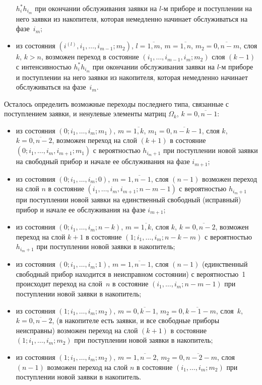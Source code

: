 \begin{multicols}{2}
\begin{itemize}
$h_i^*h_{i_m}$ при окончании обслуживания заявки на $l$-м приборе
и поступлении на него заявки из накопителя, которая немедленно
начинает обслуживаться на фазе~$i_m$;
\item
из состояния $\left(i^{(l)},i_1,\ldots,i_{m-1};m_2\right)$,
$l=\overline{1,m}$, $m=\overline{1,n}$,
$m_2=\overline{0,n-m}$, слоя $k$, $k>n$, возможен переход
в состояние $\left(i_1,\ldots, i_{m-1},i_m;m_2\right)$ слоя $(k-1)$ с
интенсивностью $h_i^*h_{i_m}$ при окончании обслуживания заявки
на $l$-м приборе и поступлении на него заявки из накопителя,
которая немедленно начинает обслуживаться на фазе~$i_m$.
\end{itemize}

Осталось определить возможные переходы последнего типа, связанные
с поступлением заявки, и ненулевые элементы матриц
$\Omega_k$, $k=\overline{0,n-1}$:
\begin{itemize}
\item из состояния $\left(0;i_1,\ldots,i_m;m_1\right)$, $m=\overline{1,k}$,
$m_1=\overline{0,n-k-1}$,
слоя $k$, $k=\overline{0,n-2}$, возможен переход на слой $(k+1)$
в состояние $\left(0;i_1,\ldots,i_m,i_{m+1};m_1\right)$ с вероятностью
$h_{i_m+1}$ при поступлении новой заявки на свободный прибор и
начале ее обслуживания на фазе $i_{m+1}$;
\item
из состояния $\left(0;i_1,\ldots,i_m;0\right)$, $m=\overline{1,n-1}$,
слоя $(n-1)$ возможен переход на слой $n$ в состояние
$\left(i_1,\ldots,i_m,i_{m+1};n-m-1\right)$ с вероятностью $h_{i_m+1}$ при
поступлении новой заявки на единственный свободный (исправный)
прибор и начале ее обслуживания на фазе $i_{m+1}$;
\item
из состояния $\left(0;i_1,\ldots,i_m;n-k\right)$, $m=\overline{1,k}$,
слоя $k$, $k=\overline{0,n-2}$, возможен переход на слой
$k+1$ в состояние $\left(1;i_1,\ldots,i_m;n-k-m\right)$ с вероятностью
$h_{i_m+1}$ при поступлении новой заявки в накопитель;
\item
из состояния $\left(0;i_1,\ldots,i_m;1\right)$, $m=\overline{1,n-1}$,
слоя $(n-1)$ (единственный свободный прибор находится в неисправном
состоянии) с ве\-ро\-ят\-ностью~1 происходит переход на слой~$n$ в
со\-сто\-яние $\left(i_1,\ldots,i_m;n-m-1\right)$ при поступлении новой заявки в
накопитель;
\item
из состояния $\left(1;i_1,\ldots,i_m;m_2\right)$, $m=\overline{0,k-1}$,
$m_2=\overline{0,k-1-m}$,
слоя~$k$, $k=\overline{0,n-2}$, (в накопителе есть заявки, и
все свободные приборы неисправны) возможен переход на слой $(k+1)$
в состояние $\left(1;i_1,\ldots,i_m;m_2\right)$ при поступлении новой заявки
в накопитель;
\item
из состояния $\left(1;i_1,\ldots,i_m;m_2\right)$, $m=\overline{1,n-2}$,
$m_2=\overline{0,n-2-m}$, слоя $(n-1)$ возможен переход на слой $n$ в
состояние $\left(i_1,\ldots,i_m;m_2\right)$ при поступлении новой заявки в
накопитель.
\end{itemize}


\end{multicols}
